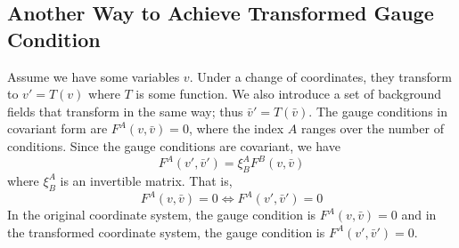 \subsection{Another Way to Achieve Transformed Gauge Condition}\label{transformgauge}
Assume we have some variables $v$. Under a change of coordinates, they transform to $v' = T\left(v\right)$ where $T$ is some function. We also introduce a 
set of background fields that transform in the same way; thus $\bar v' = T\left(\bar v\right)$. The gauge conditions in covariant form are $F^A\left(v,\bar v\right) = 0$, 
where the index $A$ ranges over the number of conditions. Since the gauge conditions are covariant, we have 
\begin{equation}
	F^A\left(v',\bar v'\right) = \xi^A_B F^B\left(v,\bar v\right)
\end{equation}
where $\xi^A_B$ is an invertible matrix. That is, 
\begin{equation}\label{covariant equivalence}
	 F^A\left(v,\bar v\right) = 0 \Longleftrightarrow F^A\left(v',\bar v'\right) = 0
\end{equation}
In the original coordinate system, the gauge condition is $F^A\left(v,\bar v\right) = 0$ and in the transformed coordinate system, the 
gauge condition is $F^A\left(v',\bar v'\right) = 0$.

